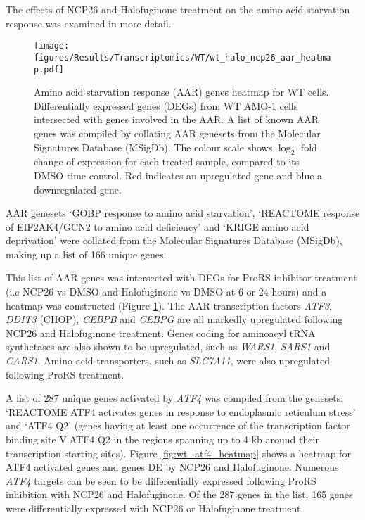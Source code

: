 The effects of NCP26 and Halofuginone treatment on the amino acid starvation response was examined in more detail.
\begin{figure}[p]
\centering
\texttt{[image: figures/Results/Transcriptomics/WT/wt\_halo\_ncp26\_aar\_heatmap.pdf]}
\caption[Amino acid starvation response genes heatmap WT cells]{Amino acid starvation response (AAR) genes heatmap for WT cells.
Differentially expressed genes (DEGs) from WT AMO-1 cells intersected with genes involved in the AAR.
A list of known AAR genes was compiled by collating AAR genesets from the Molecular Signatures Database (MSigDb).
The colour scale shows $\log_{2}$ fold change of expression for each treated sample, compared to its DMSO time control.
Red indicates an upregulated gene and blue a downregulated gene.
}
\label{fig:wt_aar_heatmap}
\end{figure}
%
AAR genesets `GOBP response to amino acid starvation', `REACTOME response of EIF2AK4/GCN2 to amino acid deficiency' and `KRIGE amino acid deprivation' were collated from the Molecular Signatures Database (MSigDb), making up a list of 166 unique genes.


This list of AAR genes was intersected with DEGs for ProRS inhibitor-treatment (i.e NCP26 vs DMSO and Halofuginone vs DMSO at 6 or 24 hours) and a heatmap was constructed (Figure \ref{fig:wt_aar_heatmap}).
The AAR transcription factors \textit{ATF3}, \textit{DDIT3} (CHOP), \textit{CEBPB} and \textit{CEBPG} are all markedly upregulated following NCP26 and Halofuginone treatment.
Genes coding for aminoacyl tRNA synthetases are also shown to be upregulated, such as \textit{WARS1}, \textit{SARS1} and \textit{CARS1}.
Amino acid transporters, such as \textit{SLC7A11}, were also upregulated following ProRS treatment.

A list of 287 unique genes activated by \textit{ATF4} was compiled from the genesets: `REACTOME ATF4 activates genes in response to endoplasmic reticulum stress' and `ATF4 Q2' (genes having at least one occurrence of the transcription factor binding site V.ATF4 Q2 in the regions spanning up to 4 kb around their transcription starting sites).
Figure \ref{fig:wt_atf4_heatmap} shows a heatmap for ATF4 activated genes and genes DE by NCP26 and Halofuginone.
Numerous \textit{ATF4} targets can be seen to be differentially expressed following ProRS inhibition with NCP26 and Halofuginone.
Of the 287 genes in the list, 165 genes were differentially expressed with NCP26 or Halofuginone treatment.


